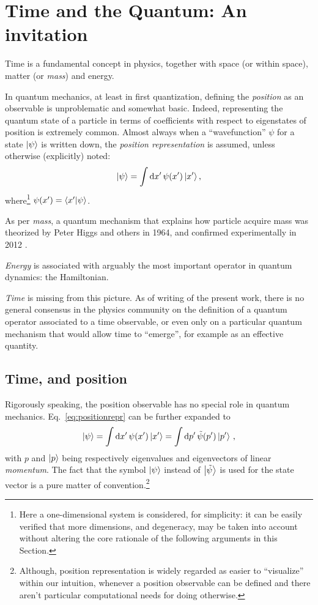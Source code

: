 \section{Time and the Quantum: An invitation}\label{sec:intro}

Time is a fundamental concept in physics, together with space (or  within space),
matter (or \emph{mass}) and energy.

In quantum mechanics, at least in first quantization, defining the \emph{position} as
an observable is unproblematic and somewhat basic.
Indeed, representing the quantum state of a particle
in terms of coefficients with respect to eigenstates of position is extremely common.
Almost always when a ``wavefunction'' $\psi$
for a state $\ket{\psi}$
is written down, the \emph{position representation}
is assumed, unless otherwise (explicitly) noted:
\begin{equation}\label{eq:positionrepr}
  \ket{\psi} = \int \dd{x'} \psi(x') \ket{x'} \text{,}
\end{equation}
where\footnote{
  Here a one-dimensional system is considered, for simplicity:
  it can be easily verified that more dimensions,
  and degeneracy, may be taken into account without altering the core rationale of the
  following arguments in this Section.
}
$\psi(x') = \braket{x'}{\psi}$.

As per \emph{mass}, a quantum mechanism that explains how particle acquire mass was theorized by
Peter Higgs and others in 1964, and confirmed experimentally in 2012
\parencite{Higgs, EnglertBrout, Kibble+, HiggsATLAS, HiggsCMS}.

\emph{Energy} is associated with arguably the most important operator in quantum dynamics: the Hamiltonian.

\emph{Time} is missing from this picture. As of writing of the present work,
there is no general consensus in the physics community on
the definition of a quantum operator associated to a time observable,
or even only on a particular quantum mechanism that would allow time to ``emerge'',
for example as an effective quantity.

\subsection{Time, and position}

Rigorously speaking, the position observable has no special role in quantum mechanics.
Eq.~\eqref{eq:positionrepr} can be further expanded to
\begin{equation}\label{eq:qprepr}
  \ket{\psi} = \int \dd{x'} \psi(x') \ket{x'} = \int \dd{p'} \tilde{\psi}(p') \ket{p'} \,\text{,}
\end{equation}
with $p$ and $\ket{p}$ being respectively eigenvalues and eigenvectors of linear \emph{momentum}.
The fact that the symbol $\ket{\psi}$ instead of $\ket{\tilde{\psi}}$
is used for the state vector is a pure matter of convention.\footnote{
  Although, position representation is widely regarded as easier
  to ``visualize'' within our intuition,
  whenever a position observable can be defined
  and there aren't particular computational needs for doing otherwise.
}

